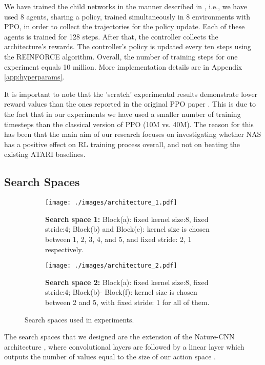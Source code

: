\documentclass{svproc}
\begin{document}
We have trained the child networks in the manner described in \cite{espeholt2018impala}, i.e., we have used 8 agents, sharing a policy, trained simultaneously in 8 environments with PPO, in order to collect the trajectories for the policy update. Each of these agents is trained for 128 steps. After that, the controller collects the architecture's rewards. The controller's policy is updated every ten steps using the REINFORCE algorithm. Overall, the number of training steps for one experiment equals 10 million. More implementation details are in Appendix \ref{app:hyperparams}.

It is important to note that the 'scratch' experimental results demonstrate lower reward values than the ones reported in the original PPO paper \cite{schulman2017proximal}. This is due to the fact that in our experiments we have used a smaller number of training timesteps than the classical version of PPO (10M vs. 40M). The reason for this has been that the main aim of our research focuses on investigating whether NAS has a positive effect on RL training process overall, and not on beating the existing ATARI baselines.
\subsection{Search Spaces}
\label{sec:search_sp}

\begin{figure}
\begin{subfigure}{\textwidth}
 \centering 
 \texttt{[image: ./images/architecture\_1.pdf]}
  \caption{\textbf{Search space 1:} Block(a): fixed kernel size:{8}, fixed stride:{4};  Block(b) and Block(c): kernel size is chosen between {1, 2, 3, 4, and 5}, and fixed stride: {2, 1} respectively.}
  \label{fig:architecture_1}
\end{subfigure}
\begin{subfigure}{\textwidth}
 \centering 
 \texttt{[image: ./images/architecture\_2.pdf]}
  \caption{\textbf{Search space 2:} Block(a): fixed kernel size:{8}, fixed stride:{4};  Block(b)- Block(f): kernel size is chosen between {2 and 5}, with fixed stride: {1} for all of them.}
  \label{fig:architecture_2}
\end{subfigure}
\caption{Search spaces used in experiments.}
\end{figure}

The search spaces that we designed are the extension of the Nature-CNN architecture \cite{Humanlevel2015}, where convolutional layers are followed by
a linear layer which outputs the number of values equal to the size of our action space \cite{Humanlevel2015}. 
\end{document}
